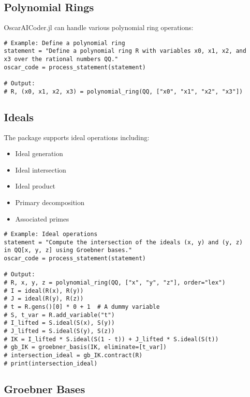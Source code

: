 \documentclass[11pt,a4paper]{article}
\begin{document}
\subsection{Polynomial Rings}

OscarAICoder.jl can handle various polynomial ring operations:

\begin{lstlisting}
# Example: Define a polynomial ring
statement = "Define a polynomial ring R with variables x0, x1, x2, and x3 over the rational numbers QQ."
oscar_code = process_statement(statement)

# Output:
# R, (x0, x1, x2, x3) = polynomial_ring(QQ, ["x0", "x1", "x2", "x3"])
\end{lstlisting}

\subsection{Ideals}

The package supports ideal operations including:

\begin{itemize}
    \item Ideal generation
    \item Ideal intersection
    \item Ideal product
    \item Primary decomposition
    \item Associated primes
\end{itemize}

\begin{lstlisting}
# Example: Ideal operations
statement = "Compute the intersection of the ideals (x, y) and (y, z) in QQ[x, y, z] using Groebner bases."
oscar_code = process_statement(statement)

# Output:
# R, x, y, z = polynomial_ring(QQ, ["x", "y", "z"], order="lex")
# I = ideal(R(x), R(y))
# J = ideal(R(y), R(z))
# t = R.gens()[0] * 0 + 1  # A dummy variable
# S, t_var = R.add_variable("t")
# I_lifted = S.ideal(S(x), S(y))
# J_lifted = S.ideal(S(y), S(z))
# IK = I_lifted * S.ideal(S(1 - t)) + J_lifted * S.ideal(S(t))
# gb_IK = groebner_basis(IK, eliminate=[t_var])
# intersection_ideal = gb_IK.contract(R)
# print(intersection_ideal)
\end{lstlisting}

\subsection{Groebner Bases}
\end{document}
